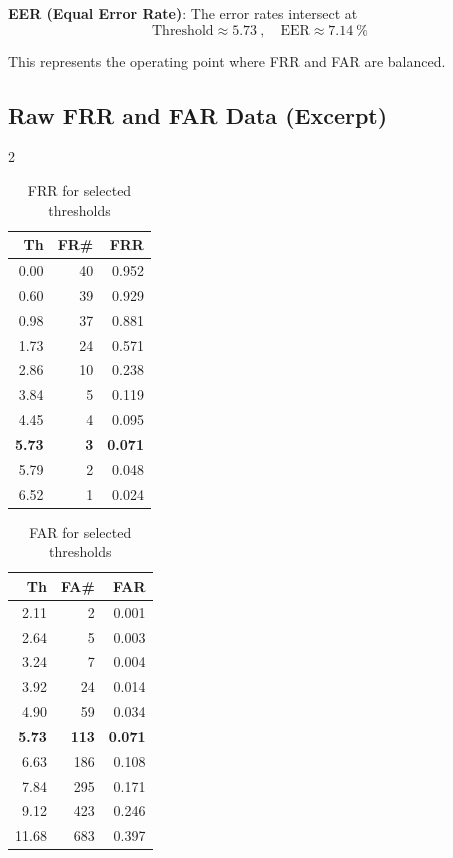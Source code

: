 \documentclass[a4paper,11pt]{article}
\begin{document}
\vspace{0.5em}
\noindent
\textbf{EER (Equal Error Rate)}: The error rates intersect at
\[
\text{Threshold} \approx \SI{5.73}{}, \quad \text{EER} \approx \SI{7.14}{\percent}
\]

This represents the operating point where FRR and FAR are balanced.

\subsection{Raw FRR and FAR Data (Excerpt)}

\begin{multicols}{2}
\begin{table}[H]
\centering
\caption{FRR for selected thresholds}
\begin{tabular}{@{}rrr@{}}
\toprule
Th & FR\# & FRR \\
\midrule
0.00 & 40 & 0.952 \\
0.60 & 39 & 0.929 \\
0.98 & 37 & 0.881 \\
1.73 & 24 & 0.571 \\
2.86 & 10 & 0.238 \\
3.84 & 5  & 0.119 \\
4.45 & 4  & 0.095 \\
\textbf{5.73} & \textbf{3}  & \textbf{0.071} \\
5.79 & 2  & 0.048 \\
6.52 & 1  & 0.024 \\
\bottomrule
\end{tabular}
\end{table}

\columnbreak

\begin{table}[H]
\centering
\caption{FAR for selected thresholds}
\begin{tabular}{@{}rrr@{}}
\toprule
Th & FA\# & FAR \\
\midrule
2.11 & 2   & 0.001 \\
2.64 & 5   & 0.003 \\
3.24 & 7   & 0.004 \\
3.92 & 24  & 0.014 \\
4.90 & 59  & 0.034 \\
\textbf{5.73} & \textbf{113} & \textbf{0.071} \\
6.63 & 186 & 0.108 \\
7.84 & 295 & 0.171 \\
9.12 & 423 & 0.246 \\
11.68 & 683 & 0.397 \\
\bottomrule
\end{tabular}
\end{table}
\end{multicols}
\end{document}
